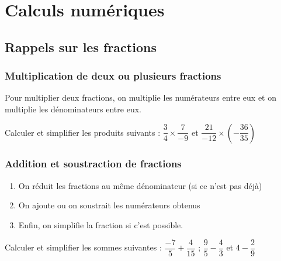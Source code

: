 \documentclass[a4paper,10pt]{report}
\begin{document}
\newpage
\setcounter{chapter}{2}
\chapter{Calculs numériques}

\section{Rappels sur les fractions}
 
\subsection{Multiplication de deux ou plusieurs fractions}
 
\begin{memento}
Pour multiplier deux fractions, on multiplie les numérateurs entre eux et on multiplie 
les dénominateurs entre eux. 
\end{memento}

\begin{ex}
Calculer et simplifier les produits suivants : \quad $\dfrac{3}{4}\times \dfrac{7}{-9}$ \quad et \quad $\dfrac{21}{-12}\times \left( -\dfrac{36}{35} \right) $
 
\medskip\noindent\grandscarreaux{\linewidth}{5.4cm}
\end{ex}

\subsection{Addition et soustraction de fractions}
 
\begin{memento}
\begin{enumerate}
\item[•] On réduit les fractions au même dénominateur (si ce n'est pas déjà)
\item[•] On ajoute ou on soustrait les numérateurs obtenus
\item[•] Enfin, on simplifie la fraction si c'est possible.
\end{enumerate}
\end{memento}

\begin{ex}
Calculer et simplifier les sommes suivantes : \quad $\dfrac{-7}{5}+ \dfrac{4}{15}$ \quad ; \quad $\dfrac{9}{5}-\dfrac{4}{3}$ \quad et \quad $4- \dfrac{2}{9}$
 
\medskip\noindent\grandscarreaux{\linewidth}{5.4cm}
\end{ex}
 
\end{document}
